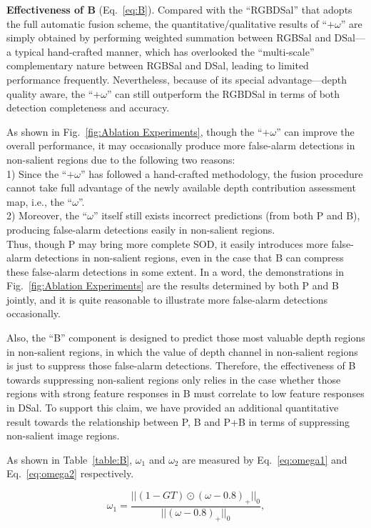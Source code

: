 \documentclass[journal]{IEEEtran}
\begin{document}
\textbf{Effectiveness of B} (Eq.~\ref{eq:B}).
Compared with the ``RGBDSal'' that adopts the full automatic fusion scheme, the quantitative/qualitative results of ``$+\omega$'' are simply obtained by performing weighted summation between RGBSal and DSal---a typical hand-crafted manner, which has overlooked the ``multi-scale'' complementary nature between RGBSal and DSal, leading to limited performance frequently.
Nevertheless, because of its special advantage---depth quality aware, the ``$+\omega$'' can still outperform the RGBDSal in terms of both detection completeness and accuracy.

As shown in Fig.~\ref{fig:Ablation Experiments}, though the ``$+\omega$'' can improve the overall performance, it may occasionally produce more false-alarm detections in non-salient regions due to the following two reasons:\\
1) Since the ``$+\omega$'' has followed a hand-crafted methodology, the fusion procedure cannot take full advantage of the newly available depth contribution assessment map, i.e., the ``$\omega$''.\\
2) Moreover, the ``$\omega$'' itself still exists incorrect predictions (from both P and B), producing false-alarm detections easily in non-salient regions.\\
Thus, though P may bring more complete SOD, it easily introduces more false-alarm detections in non-salient regions, even in the case that B can compress these false-alarm detections in some extent.
In a word, the demonstrations in Fig.~\ref{fig:Ablation Experiments} are the results determined by both P and B jointly, and it is quite reasonable to illustrate more false-alarm detections occasionally.

Also, the ``B'' component is designed to predict those most valuable depth regions in non-salient regions, in which the value of depth channel in non-salient regions is just to suppress those false-alarm detections.
Therefore, the effectiveness of B towards suppressing non-salient regions only relies in the case whether those regions with strong feature responses in B must correlate to low feature responses in DSal.
To support this claim, we have provided an additional quantitative result towards the relationship between P, B and P+B in terms of suppressing non-salient image regions.

As shown in Table~\ref{table:B}, $\omega_1$ and $\omega_2$ are measured by Eq.~\ref{eq:omega1} and Eq.~\ref{eq:omega2} respectively.

\begin{equation}
\label{eq:omega1}
\omega_1 = \frac{||(1-GT)\odot(\omega-0.8)_+||_0}{||(\omega-0.8)_+||_0},
\end{equation}
\end{document}
